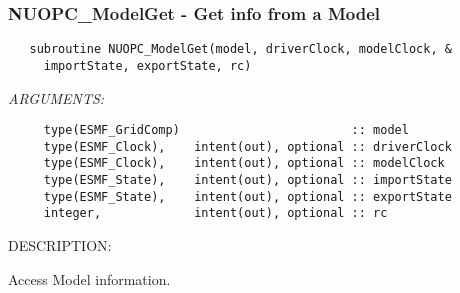  
\setlength{\oldparskip}{\parskip}
\setlength{\parskip}{1.5ex}
\setlength{\oldparindent}{\parindent}
\setlength{\parindent}{0pt}
\setlength{\oldbaselineskip}{\baselineskip}
\setlength{\baselineskip}{11pt}
 
\def\bv{\begin{verbatim}}
\def\ev{\end{verbatim}}
\def\be{\begin{equation}}
\def\ee{\end{equation}}
\def\bea{\begin{eqnarray}}
\def\eea{\end{eqnarray}}
\def\bi{\begin{itemize}}
\def\ei{\end{itemize}}
\def\bn{\begin{enumerate}}
\def\en{\end{enumerate}}
\def\bd{\begin{description}}
\def\ed{\end{description}}
\def\({\left (}
\def\){\right )}
\def\[{\left [}
\def\]{\right ]}
\def\<{\left  \langle}
\def\>{\right \rangle}
\def\cI{{\cal I}}
\def\diag{\mathop{\rm diag}}
\def\tr{\mathop{\rm tr}}


 
\subsubsection [NUOPC\_ModelGet] {NUOPC\_ModelGet - Get info from a Model}


  
\begin{verbatim}   subroutine NUOPC_ModelGet(model, driverClock, modelClock, &
     importState, exportState, rc)\end{verbatim}{\em ARGUMENTS:}
\begin{verbatim}     type(ESMF_GridComp)                        :: model
     type(ESMF_Clock),    intent(out), optional :: driverClock
     type(ESMF_Clock),    intent(out), optional :: modelClock
     type(ESMF_State),    intent(out), optional :: importState
     type(ESMF_State),    intent(out), optional :: exportState
     integer,             intent(out), optional :: rc\end{verbatim}
{\sf DESCRIPTION:\\ }


     Access Model information.
\setlength{\parskip}{\oldparskip}
\setlength{\parindent}{\oldparindent}
\setlength{\baselineskip}{\oldbaselineskip}
